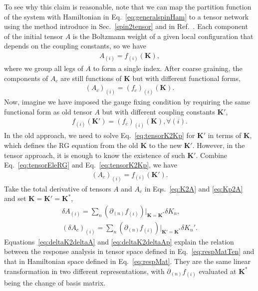 \documentclass[aps,prb,reprint,superscriptaddress,floatfix]{revtex4-2}
\begin{document}
To see why this claim is reasonable, note that we can map the partition
function of the system with Hamiltonian in Eq.~\eqref{eq:generalspinHam}
to a tensor network using the method introduce in
Sec.~\ref{spin2tensor} and
in Ref.~\cite{trg}. Each component of the initial tensor $A$ is the
Boltzmann weight of a given local configuration that depends on the
coupling constants, so we have 
%
\begin{align}\label{eq:K2A}
    A_{(i)} = f_{(i)}\left(\mathbf{K}\right),
\end{align}
%
where we group all legs of $A$ to form a single index. After coarse
graining, the components of $A_c$ are still functions of $\mathbf{K}$ but
with different functional forms,
%
\begin{align}\label{eq:tensorEleRG}
    \left(A_c\right)_{(i)} =
\left(f_c\right)_{(i)}\left(\mathbf{K}\right).
\end{align}
%
Now, imagine we have imposed the gauge fixing condition by requiring the
same functional form as old tensor $A$ but with different coupling
constants $\mathbf{K}'$, 
%
\begin{align}\label{eq:tensorK2Kp}
    f_{(i)}\left(\mathbf{K}'\right) =
    \left(f_c\right)_{(i)}\left(\mathbf{K}\right), \forall (i).
\end{align}
%
In the old approach, we need to solve Eq.~\eqref{eq:tensorK2Kp} for
$\mathbf{K}'$ in terms of $\mathbf{K}$, which defines the RG equation
from the old $\mathbf{K}$ to the new $\mathbf{K}'$. However, in the
tensor approach, it is enough to know the existence of such
$\mathbf{K}'$. Combine Eq.~\eqref{eq:tensorEleRG} and
Eq.~\eqref{eq:tensorK2Kp}, we have
%
\begin{align}\label{eq:Kp2A}
    \left(A_c\right)_{(i)} = f_{(i)}\left(\mathbf{K}'\right).
\end{align}
%
Take the total derivative of tensors $A$ and $A_c$ in Eqs.~\eqref{eq:K2A}
and \eqref{eq:Kp2A} and set $\mathbf{K} = \mathbf{K}' = \mathbf{K}^*$,
%
\begin{align}
    \delta A_{(i)} = \sum_n \left(\partial_{(n)}
    f_{(i)}\right)\Bigr|_{\mathbf{K} = \mathbf{K}^*} \delta K_n,
    \label{eq:deltaK2deltaA} \\
    \left(\delta A_c \right)_{(i)} = \sum_n \left(\partial_{(n)}
    f_{(i)}\right)\Bigr|_{\mathbf{K}' = \mathbf{K}^*} \delta
    K_n'.\label{eq:deltaK2deltaAp}  
\end{align}
%
Equations~\eqref{eq:deltaK2deltaA} and \eqref{eq:deltaK2deltaAp} explain
the relation between the response analysis in tensor space defined in
Eq.~\eqref{eq:respMatTen} and that in Hamiltonian space defined in
Eq.~\eqref{eq:respMat}. They are the same linear transformation in two
different representations, with $\partial_{(n)}f_{(i)}$ evaluated at
$\mathbf{K}^*$ being the change of basis matrix.
%
\end{document}
